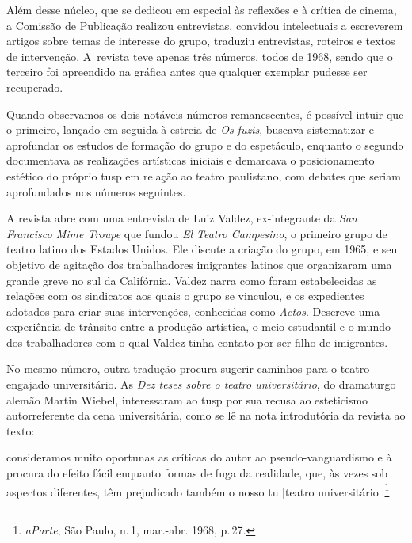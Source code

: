 {Além desse núcleo, que se dedicou em especial às reflexões e à crítica
de cinema, a Comissão de Publicação realizou entrevistas, convidou
intelectuais a escreverem artigos sobre temas de interesse do grupo,
traduziu entrevistas, roteiros e textos de intervenção. A~revista teve
apenas três números, todos de 1968, sendo que o terceiro foi apreendido
na gráfica antes que qualquer exemplar pudesse ser recuperado.


Quando observamos os dois notáveis números remanescentes, é possível
intuir que o primeiro, lançado em seguida à estreia de {\it Os fuzis},
buscava sistematizar e aprofundar os estudos de formação do grupo e do
espetáculo, enquanto o segundo documentava as realizações
artísticas iniciais e demarcava o posicionamento estético do próprio {\sc tusp} em
relação ao teatro paulistano, com debates que seriam aprofundados nos
números seguintes.

A revista abre com uma entrevista de Luiz Valdez, ex-integrante da {\it San
Francisco Mime Troupe} que fundou {\it El Teatro Campesino}, o primeiro
grupo de teatro latino dos Estados Unidos. Ele discute a criação do
grupo, em 1965, e seu objetivo de agitação dos trabalhadores imigrantes
latinos que organizaram uma grande greve no sul da Califórnia. Valdez
narra como foram estabelecidas as relações com os sindicatos aos quais o
grupo se vinculou, e os expedientes adotados para criar suas
intervenções, conhecidas como {\it Actos}. Descreve uma experiência de
trânsito entre a produção artística, o meio estudantil e o mundo dos
trabalhadores com o qual Valdez tinha contato por ser filho de
imigrantes.

No mesmo número, outra tradução procura sugerir caminhos para o teatro
engajado universitário. As {\it Dez teses sobre o teatro universitário},
do dramaturgo alemão Martin Wiebel, interessaram ao {\sc tusp} por sua recusa
ao esteticismo autorreferente da cena universitária, como se lê na nota
introdutória da revista ao texto:

\startblockquote
consideramos muito oportunas as críticas do autor ao pseudo-vanguardismo
e à procura do efeito fácil enquanto formas de fuga da realidade, que,
às vezes sob aspectos diferentes, têm prejudicado também o nosso {\sc tu}
{[}teatro universitário{]}.\footnote{{\it aParte}, São Paulo, n.\,1,
  mar.-abr. 1968, p.\,27.}
\stopblockquote

}
